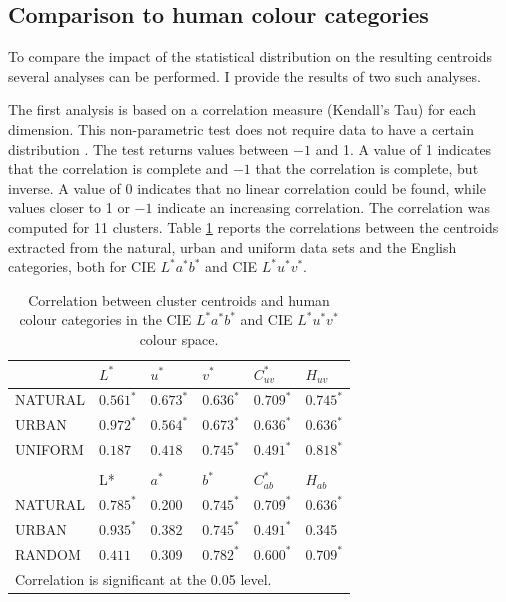 \subsection{Comparison to human colour categories}

To compare the impact of the statistical distribution on the resulting
centroids several analyses can be performed. I provide the results of
two such analyses.

The first analysis is based on a correlation measure (Kendall's Tau)
for each dimension. This non-parametric test does not require data to
have a certain distribution \citep{conover99practical}. The test
returns values between $-1$ and 1. A value of 1 indicates that the
correlation is complete and $-1$ that the correlation is complete, but
inverse. A value of 0 indicates that no linear correlation could be
found, while values closer to 1 or $-1$ indicate an increasing
correlation. The correlation was computed for 11 clusters. Table
\ref{t:clustering-correlation} reports the correlations between the
centroids extracted from the natural, urban and uniform data sets and
the English categories, both for CIE $L^*a^*b^*$ and CIE $L^*u^*v^*$.

\begin{table}[htbp]
\centering
\begin{tabular}{llllll}
\hline
& $L^*$ & $u^*$ & $v^*$ & $C^*_{uv}$ & $H_{uv}$\\
\hline
NATURAL & $0.561^*$  & $0.673^*$  & $0.636^*$  & $0.709^*$  & $0.745^*$  \\
URBAN & $0.972^*$  & $0.564^*$  & $0.673^*$  & $0.636^*$  & $0.636^*$  \\
UNIFORM & $0.187$  & $0.418$  & $0.745^*$  & $0.491^*$  & $0.818^*$  \\
\hline
\\
\hline
& L* & $a^*$ & $b^*$ & $C^*_{ab}$ & $H_{ab}$\\
\hline
NATURAL & $0.785^*$ & 0.200 & $0.745^{*}$ & $0.709^*$ & $0.636^*$ \\
URBAN & $0.935^{*}$ & $0.382$ & $0.745^{*}$ & $0.491^*$ & 0.345 \\
RANDOM & $0.411$ & 0.309 & $0.782^{*}$ & $0.600^*$ & $0.709^*$ \\
\hline
\multicolumn{6}{l}{\footnotesize* Correlation is significant at the 0.05 level.}\\	
\end{tabular}
\caption{Correlation between cluster centroids and human colour
  categories in the CIE $L^*a^*b^*$ and CIE $L^*u^*v^*$ colour space.}
\label{t:clustering-correlation}
\end{table}

